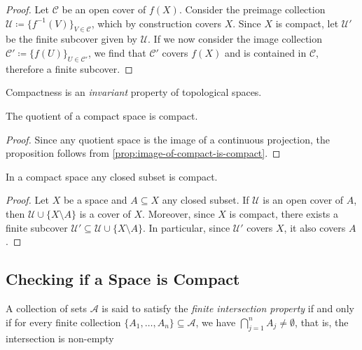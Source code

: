 \begin{proof}
    Let \(\mathcal{C}\) be an open cover of \(f(X)\). Consider the preimage
    collection \(\mathcal{U} \coloneq \{f^{-1}(V)\}_{V \in \mathcal{C}}\), which by
    construction covers \(X\). Since \(X\) is compact, let \(\mathcal{U}'\) be the
    finite subcover given by \(\mathcal{U}\). If we now consider the image
    collection \(\mathcal{C}' \coloneq \{f(U)\}_{U \in \mathcal{C}'}\), we find that
    \(\mathcal{C}'\) covers \(f(X)\) and is contained in \(\mathcal{C}\), therefore
    a finite subcover.
\end{proof}

\begin{corollary}
    \label{cor:compactness-topological-invariant}
    Compactness is an \emph{invariant} property of topological spaces.
\end{corollary}

\begin{corollary}
    \label{cor:quotient-of-compact-space-is-compact}
    The quotient of a compact space is compact.
\end{corollary}

\begin{proof}
    Since any quotient space is the image of a continuous projection, the
    proposition follows from \cref{prop:image-of-compact-is-compact}.
\end{proof}

\begin{proposition}
    \label{prop:closed-subset-compact}
    In a compact space any closed subset is compact.
\end{proposition}

\begin{proof}
    Let \(X\) be a space and \(A \subseteq X\) any closed subset. If \(\mathcal{U}\)
    is an open cover of \(A\), then \(\mathcal{U} \cup \{X \setminus A\}\) is a
    cover of \(X\). Moreover, since \(X\) is compact, there exists a finite subcover
    \(\mathcal{U}' \subseteq \mathcal{U} \cup \{X \setminus A\}\). In particular,
    since \(\mathcal{U}'\) covers \(X\), it also covers \(A\).
\end{proof}

\subsection{Checking if a Space is Compact}

\begin{definition}
    \label{def:finite-intersection-property}
    A collection of sets \(\mathcal{A}\) is said to satisfy the
    \emph{finite intersection property} if and only if for every finite collection
    \(\{A_1, \dots, A_n\} \subseteq \mathcal{A}\), we have
    \(\bigcap_{j=1}^n A_j \neq \emptyset\), that is, the intersection is non-empty
\end{definition}

